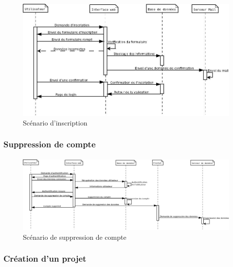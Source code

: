 \documentclass[a4paper,12pt]{article}
\begin{document}
\paragraph{}
\begin{figure}[!ht]
\begin{center}
  \includegraphics[width=1\textwidth, angle=90]{./Diagramme/CompteInscription.jpg}
\end{center}
  \caption{Scénario d'inscription}
  \label{register}
\end{figure}

\newpage
\subsubsection{Suppression de compte}
\paragraph{}
\begin{figure}[!ht]
\begin{center}
  \includegraphics[width=1\textwidth, angle=90]{./Diagramme/CompteSuppression.jpg}
\end{center}
  \caption{Scénario de suppression de compte}
  \label{deleteAccount}
\end{figure}

\newpage
\subsubsection{Création d'un projet}
\end{document}
